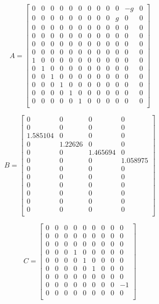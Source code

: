 \begin{equation}
 	A=\begin{bmatrix}
 	0 & 0 & 0 & 0 & 0 & 0 & 0 & 0 & 0 & 0 & -g & 0 \\
 	0 & 0 & 0 & 0 & 0 & 0 & 0 & 0 & 0 & g & 0 & 0 \\
 	0 & 0 & 0 & 0 & 0 & 0 & 0 & 0 & 0 & 0 & 0 & 0 \\
 	0 & 0 & 0 & 0 & 0 & 0 & 0 & 0 & 0 & 0 & 0 & 0 \\
 	0 & 0 & 0 & 0 & 0 & 0 & 0 & 0 & 0 & 0 & 0 & 0 \\
 	0 & 0 & 0 & 0 & 0 & 0 & 0 & 0 & 0 & 0 & 0 & 0 \\
 	1 & 0 & 0 & 0 & 0 & 0 & 0 & 0 & 0 & 0 & 0 & 0 \\
 	0 & 1 & 0 & 0 & 0 & 0 & 0 & 0 & 0 & 0 & 0 & 0 \\
 	0 & 0 & 1 & 0 & 0 & 0 & 0 & 0 & 0 & 0 & 0 & 0 \\
 	0 & 0 & 0 & 1 & 0 & 0 & 0 & 0 & 0 & 0 & 0 & 0 \\
 	0 & 0 & 0 & 0 & 1 & 0 & 0 & 0 & 0 & 0 & 0 & 0 \\
 	0 & 0 & 0 & 0 & 0 & 1 & 0 & 0 & 0 & 0 & 0 & 0 \\
 	\end{bmatrix}
 \end{equation}
 
 \begin{equation}
 	B=\begin{bmatrix}
 	0 & 0 & 0 & 0 \\
 	0 & 0 & 0 & 0 \\
 	1.585104 & 0 & 0 & 0 \\
 	0 & 1.22626 & 0 & 0 \\
 	0 & 0 & 1.465694 & 0 \\
 	0 & 0 & 0 & 1.058975 \\
 	0 & 0 & 0 & 0 \\
 	0 & 0 & 0 & 0 \\
 	0 & 0 & 0 & 0 \\
 	0 & 0 & 0 & 0 \\
 	0 & 0 & 0 & 0 \\
 	0 & 0 & 0 & 0 \\
 	\end{bmatrix}
 \end{equation}
 
 \begin{equation}
 	C=\begin{bmatrix}
 	0 & 0 & 0 & 0 & 0 & 0 & 0 & 0 & 0 \\
 	0 & 0 & 0 & 0 & 0 & 0 & 0 & 0 & 0 \\
 	0 & 0 & 0 & 0 & 0 & 0 & 0 & 0 & 0 \\
 	0 & 0 & 0 & 1 & 0 & 0 & 0 & 0 & 0 \\
 	0 & 0 & 0 & 0 & 1 & 0 & 0 & 0 & 0 \\
 	0 & 0 & 0 & 0 & 0 & 1 & 0 & 0 & 0 \\
 	0 & 0 & 0 & 0 & 0 & 0 & 0 & 0 & 0 \\
 	0 & 0 & 0 & 0 & 0 & 0 & 0 & 0 & -1 \\
 	0 & 0 & 0 & 0 & 0 & 0 & 0 & 0 & 0 \\
 	\end{bmatrix}
 \end{equation}
 
